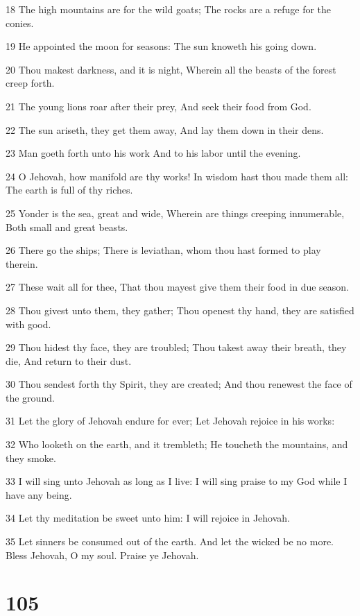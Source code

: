 \par 18 The high mountains are for the wild goats; The rocks are a refuge for the conies.
\par 19 He appointed the moon for seasons: The sun knoweth his going down.
\par 20 Thou makest darkness, and it is night, Wherein all the beasts of the forest creep forth.
\par 21 The young lions roar after their prey, And seek their food from God.
\par 22 The sun ariseth, they get them away, And lay them down in their dens.
\par 23 Man goeth forth unto his work And to his labor until the evening.
\par 24 O Jehovah, how manifold are thy works! In wisdom hast thou made them all: The earth is full of thy riches.
\par 25 Yonder is the sea, great and wide, Wherein are things creeping innumerable, Both small and great beasts.
\par 26 There go the ships; There is leviathan, whom thou hast formed to play therein.
\par 27 These wait all for thee, That thou mayest give them their food in due season.
\par 28 Thou givest unto them, they gather; Thou openest thy hand, they are satisfied with good.
\par 29 Thou hidest thy face, they are troubled; Thou takest away their breath, they die, And return to their dust.
\par 30 Thou sendest forth thy Spirit, they are created; And thou renewest the face of the ground.
\par 31 Let the glory of Jehovah endure for ever; Let Jehovah rejoice in his works:
\par 32 Who looketh on the earth, and it trembleth; He toucheth the mountains, and they smoke.
\par 33 I will sing unto Jehovah as long as I live: I will sing praise to my God while I have any being.
\par 34 Let thy meditation be sweet unto him: I will rejoice in Jehovah.
\par 35 Let sinners be consumed out of the earth. And let the wicked be no more. Bless Jehovah, O my soul. Praise ye Jehovah.

\chapter{105}

